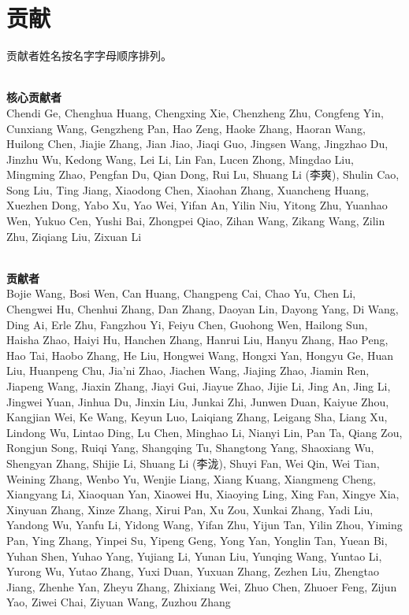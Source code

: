 \newpage
\section{贡献}
\label{sec:contribution}
\newcommand{\cpara}[1]{~\\\textbf{#1}~\\}
贡献者姓名按名字字母顺序排列。

\cpara{核心贡献者}

Chendi Ge, Chenghua Huang, Chengxing Xie, Chenzheng Zhu, Congfeng Yin, Cunxiang Wang, Gengzheng Pan, Hao Zeng, Haoke Zhang, Haoran Wang, Huilong Chen, Jiajie Zhang, Jian Jiao, Jiaqi Guo, Jingsen Wang, Jingzhao Du, Jinzhu Wu, Kedong Wang, Lei Li, Lin Fan, Lucen Zhong, Mingdao Liu, Mingming Zhao, Pengfan Du, Qian Dong, Rui Lu, Shuang Li (李爽), Shulin Cao, Song Liu, Ting Jiang, Xiaodong Chen, Xiaohan Zhang, Xuancheng Huang, Xuezhen Dong, Yabo Xu, Yao Wei, Yifan An, Yilin Niu, Yitong Zhu, Yuanhao Wen, Yukuo Cen, Yushi Bai, Zhongpei Qiao, Zihan Wang, Zikang Wang, Zilin Zhu, Ziqiang Liu, Zixuan Li

\cpara{贡献者}

Bojie Wang, Bosi Wen, Can Huang, Changpeng Cai, Chao Yu, Chen Li, Chengwei Hu, Chenhui Zhang, Dan Zhang, Daoyan Lin, Dayong Yang, Di Wang, Ding Ai, Erle Zhu, Fangzhou Yi, Feiyu Chen, Guohong Wen, Hailong Sun, Haisha Zhao, Haiyi Hu, Hanchen Zhang, Hanrui Liu, Hanyu Zhang, Hao Peng, Hao Tai, Haobo Zhang, He Liu, Hongwei Wang, Hongxi Yan, Hongyu Ge, Huan Liu, Huanpeng Chu, Jia'ni Zhao, Jiachen Wang, Jiajing Zhao, Jiamin Ren, Jiapeng Wang, Jiaxin Zhang, Jiayi Gui, Jiayue Zhao, Jijie Li, Jing An, Jing Li, Jingwei Yuan, Jinhua Du, Jinxin Liu, Junkai Zhi, Junwen Duan, Kaiyue Zhou, Kangjian Wei, Ke Wang, Keyun Luo, Laiqiang Zhang, Leigang Sha, Liang Xu, Lindong Wu, Lintao Ding, Lu Chen, Minghao Li, Nianyi Lin, Pan Ta, Qiang Zou, Rongjun Song, Ruiqi Yang, Shangqing Tu, Shangtong Yang, Shaoxiang Wu, Shengyan Zhang, Shijie Li, Shuang Li (李泷), Shuyi Fan, Wei Qin, Wei Tian, Weining Zhang, Wenbo Yu, Wenjie Liang, Xiang Kuang, Xiangmeng Cheng, Xiangyang Li, Xiaoquan Yan, Xiaowei Hu, Xiaoying Ling, Xing Fan, Xingye Xia, Xinyuan Zhang, Xinze Zhang, Xirui Pan, Xu Zou, Xunkai Zhang, Yadi Liu, Yandong Wu, Yanfu Li, Yidong Wang, Yifan Zhu, Yijun Tan, Yilin Zhou, Yiming Pan, Ying Zhang, Yinpei Su, Yipeng Geng, Yong Yan, Yonglin Tan, Yuean Bi, Yuhan Shen, Yuhao Yang, Yujiang Li, Yunan Liu, Yunqing Wang, Yuntao Li, Yurong Wu, Yutao Zhang, Yuxi Duan, Yuxuan Zhang, Zezhen Liu, Zhengtao Jiang, Zhenhe Yan, Zheyu Zhang, Zhixiang Wei, Zhuo Chen, Zhuoer Feng, Zijun Yao, Ziwei Chai, Ziyuan Wang, Zuzhou Zhang


